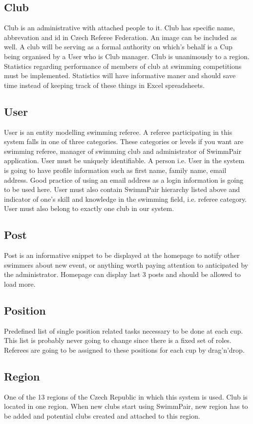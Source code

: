 \subsection*{Club}
\par
Club is an administrative with attached people to it. Club has specific name, abbrevation and id in Czech Referee Federation. An image can be included as well. A club will be serving as a formal authority on which's behalf is a Cup being organised by a User who is Club manager. Club is unanimously to a region. Statistics regarding performance of members of club at swimming competitions must be implemented. Statistics will have informative maner and should save time instead of keeping track of these things in Excel spreadsheets. 
\subsection*{User}
\par
User is an entity modelling swimming referee. A referee participating in this system falls in one of three categories. These categories or levels if you want are swimming referee, manager of swimming club and administrator of SwimmPair application. User must be uniquely identifiable. A person i.e. User in the system is going to have profile information such as first name, family name, email address. Good practice of using an email address as a login information is going to be used here. User must also contain SwimmPair hierarchy listed above and indicator of one's skill and knowledge in the swimming field, i.e. referee category. User must also belong to exactly one club in our system.
\subsection*{Post}
\par
Post is an informative snippet to be displayed at the homepage to notify other swimmers about new event, or anything worth paying attention to anticipated by the administrator. Homepage can display last 3 posts and should be allowed to load more.
\subsection*{Position}
Predefined list of single position related tasks necessary to be done at each cup. This list is probably never going to change since there is a fixed set of roles. Referees are going to be assigned to these positions for each cup by drag'n'drop.
\subsection*{Region}
One of the 13 regions of the Czech Republic in which this system is used. Club is located in one region. When new clubs start using SwimmPair, new region has to be added and potential clubs created and attached to this region. 
